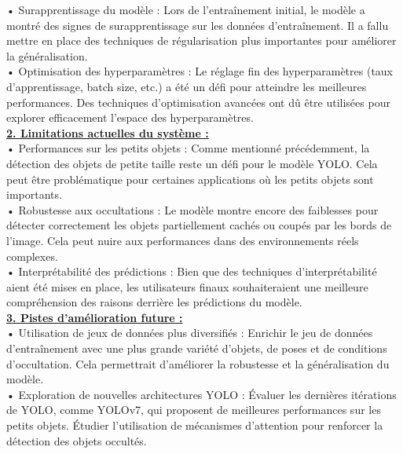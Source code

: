 \documentclass[a4paper, 13px]{article}
\begin{document}
•	Surapprentissage du modèle : Lors de l'entraînement initial, le modèle a montré des signes de surapprentissage sur les données d'entraînement. Il a fallu mettre en place des techniques de régularisation plus importantes pour améliorer la généralisation.\\

•	Optimisation des hyperparamètres : Le réglage fin des hyperparamètres (taux d'apprentissage, batch size, etc.) a été un défi pour atteindre les meilleures performances. Des techniques d'optimisation avancées ont dû être utilisées pour explorer efficacement l'espace des hyperparamètres.\\

{\bfseries \underline{2.	Limitations actuelles du système :}}\\

•	Performances sur les petits objets : Comme mentionné précédemment, la détection des objets de petite taille reste un défi pour le modèle YOLO. Cela peut être problématique pour certaines applications où les petits objets sont importants.\\

•	Robustesse aux occultations : Le modèle montre encore des faiblesses pour détecter correctement les objets partiellement cachés ou coupés par les bords de l'image. Cela peut nuire aux performances dans des environnements réels complexes.\\

•	Interprétabilité des prédictions : Bien que des techniques d'interprétabilité aient été mises en place, les utilisateurs finaux souhaiteraient une meilleure compréhension des raisons derrière les prédictions du modèle.\\

{\bfseries \underline{3.	Pistes d'amélioration future :}}\\

•	Utilisation de jeux de données plus diversifiés : Enrichir le jeu de données d'entraînement avec une plus grande variété d'objets, de poses et de conditions d'occultation. Cela permettrait d'améliorer la robustesse et la généralisation du modèle.\\

•	Exploration de nouvelles architectures YOLO : Évaluer les dernières itérations de YOLO, comme YOLOv7, qui proposent de meilleures performances sur les petits objets. Étudier l'utilisation de mécanismes d'attention pour renforcer la détection des objets occultés.\\
\end{document}
